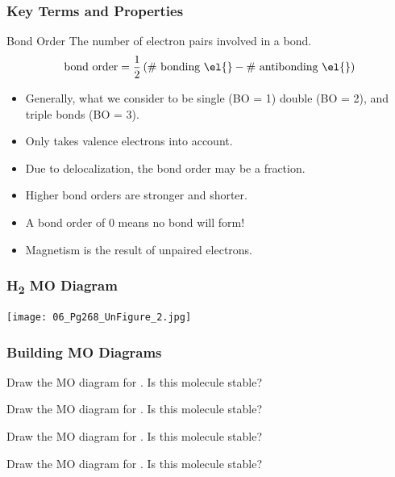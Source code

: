 \documentclass[notes=only]{beamer}
\begin{document}
\begin{frame}[c]
	\frametitle{Key Terms and Properties}
	\begin{block}{Bond Order}
		The number of electron \alert{pairs} involved in a bond.
		\begin{equation*}
			\text{bond order} = \frac{1}{2}\left(\text{\#
				bonding \el{}} - \text{\# antibonding
			\el{}}\right)
		\end{equation*}
	\end{block}

	\begin{itemize}
		\item Generally, what we consider to be single
			(BO = 1)
			double (BO = 2), and triple bonds (BO =
			3).
		\item Only takes \alert{valence} electrons into
			account.
		\item Due to \alert{delocalization}, the bond
			order may be a fraction.
		\item Higher bond orders are \alert{stronger} and
			\alert{shorter}.
		\item A bond order of 0 means \alert{no} bond
			will form!
		\item \alert{Magnetism} is the result of \alert{unpaired}
			electrons.
	\end{itemize}
\end{frame}

\begin{frame}[c]
	\frametitle{H\textsubscript{2} MO Diagram}
	\begin{center}
		\texttt{[image: 06\_Pg268\_UnFigure\_2.jpg]}
	\end{center}
\end{frame}

\begin{frame}[t,allowframebreaks]
	\frametitle{Building MO Diagrams}
	Draw the MO diagram for . Is this molecule
	stable?

	\framebreak

	Draw the MO diagram for . Is this molecule
	stable?

	\framebreak

	Draw the MO diagram for . Is this molecule
	stable?

	\framebreak

	Draw the MO diagram for . Is this molecule
	stable?
\end{frame}

\clearpage
\end{document}

